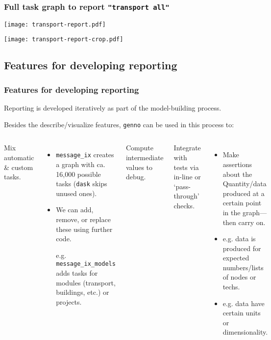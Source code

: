 \documentclass[12pt,aspectratio=169]{beamer}
\renewcommand{\mod}[1]{\texttt{#1}}
\begin{document}
\begin{frame}
\frametitle{Full task graph to report \texttt{"transport all"}}

\hspace*{-10mm}
\texttt{[image: transport-report.pdf]}

\end{frame}

\begin{frame}[plain]

\vspace*{-1mm}
\texttt{[image: transport-report-crop.pdf]}

\end{frame}

\subsection{Features for developing reporting}

\begin{frame}
\frametitle{Features for developing reporting}
\vspace*{-2mm}
Reporting is developed iteratively as part of the model-building process.

Besides the describe/visualize features,
\mod{genno} can be used in this process to:

\begin{columns}[T]
\column{0.45\paperwidth}
Mix automatic \& custom tasks.
\begin{itemize}
  \item \mod{message_ix} creates a graph with ca. 16,000 possible tasks (\texttt{dask} skips unused ones).
  \item We can add, remove, or replace these using further code.

    e.g. \mod{message_ix_models} adds tasks for modules (transport, buildings, etc.) or projects.
\end{itemize}

Compute intermediate values to debug.

\column{0.45\paperwidth}
Integrate with tests via in-line or ‘pass-through' checks.
\begin{itemize}
  \item Make assertions about the Quantity/data produced
    at a certain point in the graph—then carry on.
  \item e.g. data is produced for expected numbers/lists of nodes or techs.
  \item e.g. data have certain units or dimensionality.
\end{itemize}
\end{columns}
\end{frame}
\end{document}
